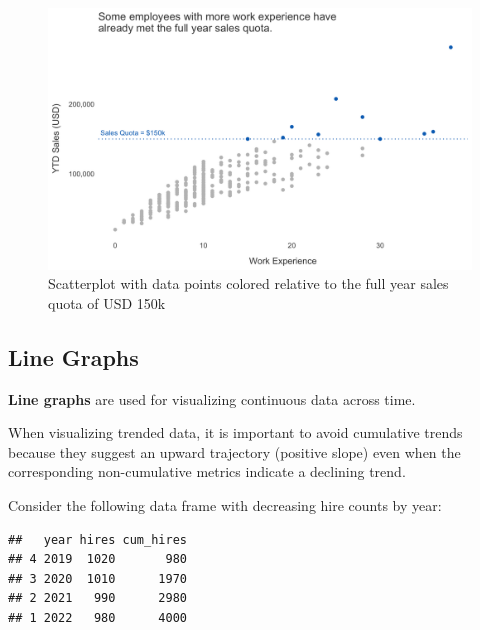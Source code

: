 \documentclass[
]{book}
\newenvironment{Shaded}{\begin{snugshade}}{\end{snugshade}}
\newcommand{\AttributeTok}[1]{\textcolor[rgb]{0.77,0.63,0.00}{#1}}
\newcommand{\CommentTok}[1]{\textcolor[rgb]{0.56,0.35,0.01}{\textit{#1}}}
\newcommand{\ConstantTok}[1]{\textcolor[rgb]{0.00,0.00,0.00}{#1}}
\newcommand{\FunctionTok}[1]{\textcolor[rgb]{0.00,0.00,0.00}{#1}}
\newcommand{\NormalTok}[1]{#1}
\newcommand{\SpecialCharTok}[1]{\textcolor[rgb]{0.00,0.00,0.00}{#1}}
\begin{document}
\begin{figure}

{\centering \includegraphics[width=1\linewidth]{graphics/scatterplot_2} 

}

\caption{Scatterplot with data points colored relative to the full year sales quota of USD 150k}\label{fig:scatterplot-2}
\end{figure}

\hypertarget{line-graphs}{%
\subsection{Line Graphs}\label{line-graphs}}

\textbf{Line graphs} are used for visualizing continuous data across time.

When visualizing trended data, it is important to avoid cumulative trends because they suggest an upward trajectory (positive slope) even when the corresponding non-cumulative metrics indicate a declining trend.

Consider the following data frame with decreasing hire counts by year:

\begin{Shaded}
\end{Shaded}

\begin{verbatim}
##   year hires cum_hires
## 4 2019  1020       980
## 3 2020  1010      1970
## 2 2021   990      2980
## 1 2022   980      4000
\end{verbatim}
\end{document}
